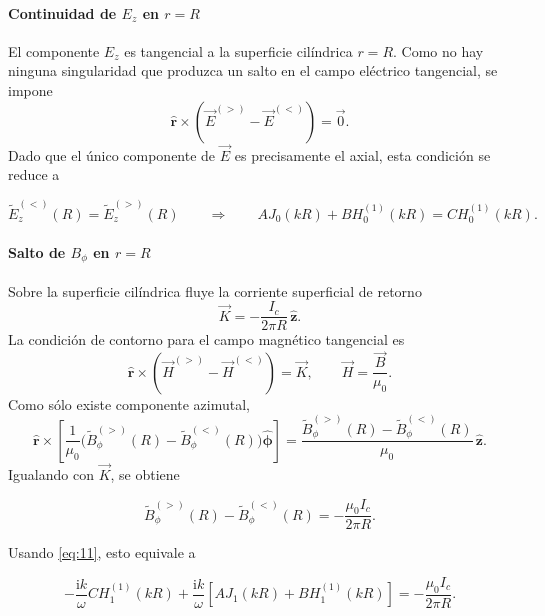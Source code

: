 \documentclass{article}
\numberwithin{equation}{section}
\newcommand{\iu}{\mathrm{i}}
\newcommand{\hr}{\hat{\mathbf r}}
\newcommand{\hp}{\hat{\boldsymbol\phi}}
\newcommand{\hz}{\hat{\mathbf z}}
\begin{document}
\paragraph{Continuidad de $E_z$ en $r=R$}

El componente $E_z$ es tangencial a la superficie cilíndrica $r=R$. Como no hay ninguna singularidad que produzca un salto en el campo eléctrico tangencial, se impone
\begin{equation*}
    \hr\times\left(\vec E^{(>)}-\vec E^{(<)}\right)=\vec 0.
\end{equation*}
Dado que el único componente de $\vec E$ es precisamente el axial, esta condición se reduce a

\begin{equation}\tag{25}\label{eq:25}
    \widetilde E_z^{(<)}(R)=\widetilde E_z^{(>)}(R)
    \qquad\Rightarrow\qquad
    AJ_0(kR)+BH_0^{(1)}(kR)=CH_0^{(1)}(kR).
\end{equation}

\paragraph{Salto de $B_{\phi}$ en $r=R$}

Sobre la superficie cilíndrica fluye la corriente superficial de retorno
\begin{equation*}
    \vec K=-\frac{I_c}{2\pi R}\,\hz.
\end{equation*}
La condición de contorno para el campo magnético tangencial es
\begin{equation*}
    \hr\times\left(\vec H^{(>)}-\vec H^{(<)}\right)=\vec K,
    \qquad
    \vec H=\frac{\vec B}{\mu_0}.
\end{equation*}
Como sólo existe componente azimutal,
\begin{equation*}
    \hr\times\left[\frac{1}{\mu_0}\bigl(\widetilde B_{\phi}^{(>)}(R)-\widetilde B_{\phi}^{(<)}(R)\bigr)\hp\right]
    =\frac{\widetilde B_{\phi}^{(>)}(R)-\widetilde B_{\phi}^{(<)}(R)}{\mu_0}\,\hz.
\end{equation*}
Igualando con $\vec K$, se obtiene

\begin{equation}\tag{26}\label{eq:26}
    \widetilde B_{\phi}^{(>)}(R)-\widetilde B_{\phi}^{(<)}(R)=-\frac{\mu_0 I_c}{2\pi R}.
\end{equation}

Usando \eqref{eq:11}, esto equivale a

\begin{equation}\tag{27}\label{eq:27}
    -\frac{\iu k}{\omega}CH_1^{(1)}(kR)
    +\frac{\iu k}{\omega}\left[AJ_1(kR)+BH_1^{(1)}(kR)\right]
    =-\frac{\mu_0 I_c}{2\pi R}.
\end{equation}
\end{document}
